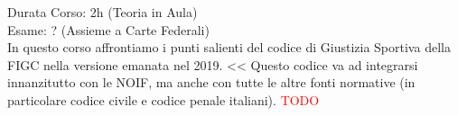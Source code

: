 \documentclass[../uefaC.tex]{subfiles}
\begin{document}

Durata Corso: 2h (Teoria in Aula) \hfill \\
Esame: ? (Assieme a Carte Federali)
\hfill \\
In questo corso affrontiamo i punti salienti del codice di Giustizia Sportiva della FIGC nella versione emanata nel 2019. \hfill <<
Questo codice va ad integrarsi innanzitutto con le NOIF, ma anche con tutte le altre fonti normative (in particolare codice civile e codice penale italiani).
\textcolor{red}{TODO}
\end{document}
